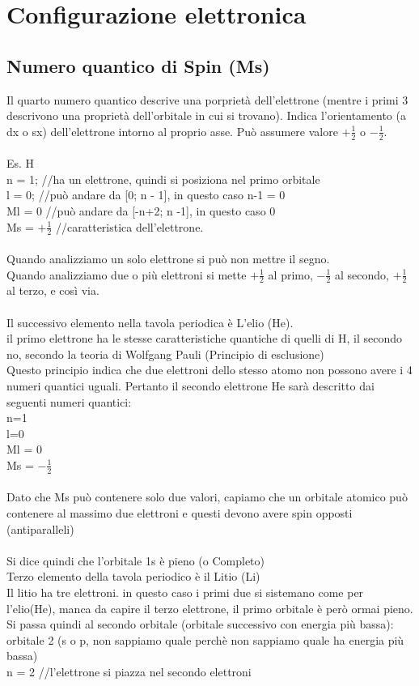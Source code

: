 \section{Configurazione elettronica}
\subsection{Numero quantico di Spin (Ms)}
Il quarto numero quantico descrive una porprietà dell’elettrone (mentre i primi 3 descrivono una proprietà dell’orbitale in cui si trovano). Indica l’orientamento (a dx o sx) dell’elettrone intorno al proprio asse. Può assumere valore $+\frac{1}{2}$ o $-\frac{1}{2}$.\\\\ 
Es. H\\
n = 1; //ha un elettrone, quindi si posiziona nel primo orbitale\\
l = 0; //può  andare da [0; n - 1], in questo caso n-1 = 0\\
Ml = 0 //può andare da [-n+2; n -1], in questo caso 0\\
Ms = $+\frac{1}{2}$ //caratteristica dell’elettrone.\\\\
Quando analizziamo un solo elettrone si può non mettre il segno.\\
Quando analizziamo due o più elettroni si mette $+\frac{1}{2}$ al primo, $-\frac{1}{2}$ al secondo, $+\frac{1}{2}$ al terzo, e così via.\\\\
Il successivo elemento nella tavola periodica è L’elio (He).\\
il primo elettrone ha le stesse caratteristiche quantiche di quelli di H, il secondo no, secondo la teoria di Wolfgang Pauli (Principio di esclusione)\\
Questo principio indica che due elettroni dello stesso atomo non possono avere i 4 numeri quantici uguali. Pertanto il secondo elettrone He sarà descritto dai seguenti numeri quantici:\\
n=1\\
l=0\\
Ml = 0\\
Ms = $-\frac{1}{2}$\\\\
Dato che Ms può contenere solo due valori, capiamo che un orbitale atomico può contenere al massimo due elettroni e questi devono avere spin opposti (antiparalleli)\\\\
Si dice quindi che l’orbitale 1s è pieno (o Completo)\\
Terzo elemento della tavola periodico è il Litio (Li)\\
Il litio ha tre elettroni. in questo caso i primi due si sistemano come per l’elio(He), manca da capire il terzo elettrone, il primo orbitale è però ormai pieno.\\
Si passa quindi al secondo orbitale (orbitale successivo con energia più bassa): orbitale 2 (s o p, non sappiamo quale perchè non sappiamo quale ha energia più bassa)\\
n = 2 //l’elettrone si piazza nel secondo elettroni

